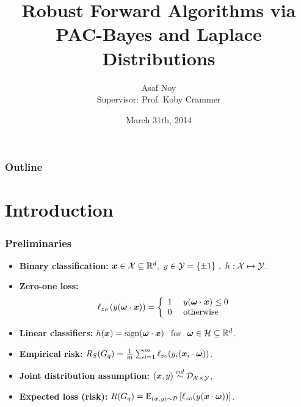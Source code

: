 \documentclass[mathserif]{beamer}
\title[]
{Robust Forward Algorithms via PAC-Bayes and Laplace Distributions}
\author[Asaf Noy]{Asaf Noy \\ Supervisor: Prof. Koby Crammer}
\institute[] %
{Department of Electrical Engineering \\ Technion - Israel Institute of Technology\\ Haifa, Israel\bigskip\\}
\date[March 31th, 2014]{March 31th, 2014}
\begin{document}
\begin{frame}  %
  \titlepage
\end{frame}

\begin{frame} %
  \frametitle{Outline}
  \tableofcontents[pausesections]
\end{frame}
%

\section{Introduction}

%

\begin{frame}
\frametitle{Preliminaries}
\begin{itemize}
\item \textbf{Binary classification:}
${\boldsymbol{x}}\in{\mathcal{X}}\subseteq \mathbb{R}^d , ~y\in{\mathcal{Y}}=\{\pm1 \}~,~ h:{\mathcal{X}} \mapsto {\mathcal{Y}} $.
\item \textbf{Zero-one loss:}
 \begin{align*}
 \ell_{zo}\left({y ({\boldsymbol{\omega}} \cdot {\boldsymbol{x}})}\right) = \left\{ \begin{array}{rl}
 1 &\mbox{  $y ({\boldsymbol{\omega}} \cdot {\boldsymbol{x}}) \leq 0$} \\
  0 &\mbox{ otherwise}
       \end{array} \right.
       \end{align*}
\item \textbf{Linear classifiers:} $h({\boldsymbol{x}}) = {\rm sign}({\boldsymbol{\omega}}\cdot{\boldsymbol{x}}) ~$ for  $~{\boldsymbol{\omega}}\in {\mathcal{H}}\subseteq\mathbb{R}^d$.

\item \textbf{Empirical risk:} $R_S(G_q)=\frac{1}{m}\sum_{i=1}^m \ell_{zo}(y_{i}({\boldsymbol{x}}_{i}\cdot{\boldsymbol{\omega}}))$.
\item  \textbf{Joint distribution assumption:}    $({\boldsymbol{x}},y)\stackrel{iid}{\sim}  {\cal D}_{{\mathcal{X}} \times {\mathcal{Y}}}$,
\item \textbf{Expected loss (risk):} $R(G_q)={\rm E}_{({\boldsymbol{x}},y)\sim {\cal D}}\left[{\ell_{zo}(y({\boldsymbol{x}}\cdot{\boldsymbol{\omega}}))}\right]$.

\end{itemize}
\end{frame}
%
\end{document}
